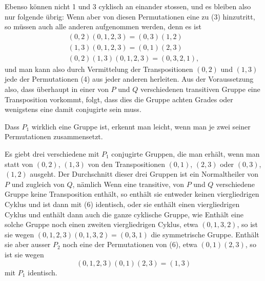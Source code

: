 Ebenso können nicht 1 und 3 cyklisch an einander stossen, und es bleiben also nur folgende übrig:
Wenn aber von diesen Permutationen eine zu (3) hinzutritt, so müssen auch alle anderen aufgenommen werden, denn es ist
\[
\begin{gathered}
(0,2)(0,1,2,3) = (0,3)(1,2) \\
(1,3)(0,1,2,3) = (0,1)(2,3) \\
(0,2)(1,3)(0,1,2,3) = (0,3,2,1),
\end{gathered}
\]
und man kann also durch Vermittelung der Transpositionen $(0,2)$ und $(1,3)$ jede der Permutationen (4) aus jeder anderen herleiten. Aus der Voraussetzung also, dass überhaupt in einer von $P$ und $Q$ verschiedenen transitiven Gruppe eine Transposition vorkommt, folgt, dass dies die Gruppe achten Grades
oder wenigstens eine damit conjugirte sein muss.

Dass $P_1$ wirklich eine Gruppe ist, erkennt man leicht, wenn man je zwei seiner Permutationen zusammensetzt.

Es giebt drei verschiedene mit $P_1$ conjugirte Gruppen, die man erhält, wenn man statt von $(0,2)$, $(1,3)$ von den Transpositionen $(0,1)$, $(2,3)$ oder $(0,3)$, $(1,2)$ ausgeht. Der Durchschnitt dieser drei Gruppen ist ein Normaltheiler von $P$ und zugleich von $Q$, nämlich
Wenn eine transitive, von $P$ und $Q$ verschiedene Gruppe keine Transposition enthält, so enthält sie entweder keinen viergliedrigen Cyklus und ist dann mit (6) identisch, oder sie enthält einen viergliedrigen Cyklus und enthält dann auch die ganze cyklische Gruppe, wie
Enthält eine solche Gruppe noch einen zweiten viergliedrigen Cyklus, etwa $(0,1,3,2)$, so ist sie wegen $(0,1,2,3)(0,1,3,2) = (0,3,1)$ die symmetrische Gruppe. Enthält sie aber ausser $P_2$ noch eine der Permutationen von (6), etwa $(0,1)(2,3)$, so ist sie wegen
\[
(0,1,2,3)(0,1)(2,3) = (1,3)
\]
mit $P_1$ identisch.
